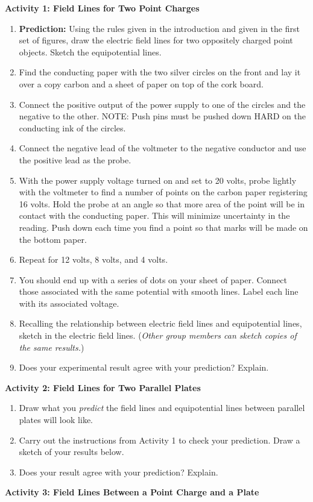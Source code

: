 \textbf{Activity 1: Field Lines for Two Point Charges}

\begin{enumerate}[wide, label=(\emph{\alph*})] 
\item\textbf{Prediction:} Using the rules given in the introduction and
given in the first set of figures, draw the electric field lines for two
oppositely charged point objects. Sketch the equipotential lines.
\answerspace{1in}

\item Find the conducting paper with the two silver circles on the front
and lay it over a copy carbon and a sheet of paper on top of the cork
board.
\item Connect the positive output of the power supply to one of the circles
and the negative to the other. NOTE: Push pins must be pushed down HARD on the 
conducting ink of the circles.
\item Connect the negative lead of the voltmeter to the negative conductor
and use the positive lead as the probe. 
\item With the power supply voltage turned on and set to 20 volts, probe
lightly with the voltmeter to find a number of points on the carbon
paper registering 16 volts. Hold the probe at an angle so that more area of the 
point will be in contact with the conducting paper. This will minimize 
uncertainty in the reading. Push down each time you find a point so
that marks will be made on the bottom paper.
\item Repeat for 12 volts, 8 volts, and 4 volts.
\item You should end up with a series of dots on your sheet of paper. Connect
those associated with the same potential with smooth lines. Label each line 
with its associated voltage.
\item Recalling the relationship between electric field lines and equipotential
lines, sketch in the electric field lines. (\emph{Other group members
can sketch copies of the same results.})
\item Does your experimental result agree with your prediction? Explain.
\answerspace{15mm}

\end{enumerate}

\pagebreak[2]
\textbf{Activity 2: Field Lines for Two Parallel Plates}

\begin{enumerate}[wide, label=(\emph{\alph*})]
\item Draw what you \textit{predict} the field lines and equipotential
lines between parallel plates will look like.
\answerspace{1.2in}

\item Carry out the instructions from Activity 1 to check your prediction.  Draw a sketch of your results below.
\answerspace{1.2in}

\item Does your result agree with your prediction? Explain.
\answerspace{.5in}

\end{enumerate}
\textbf{Activity 3: Field Lines Between a Point Charge and a Plate}

